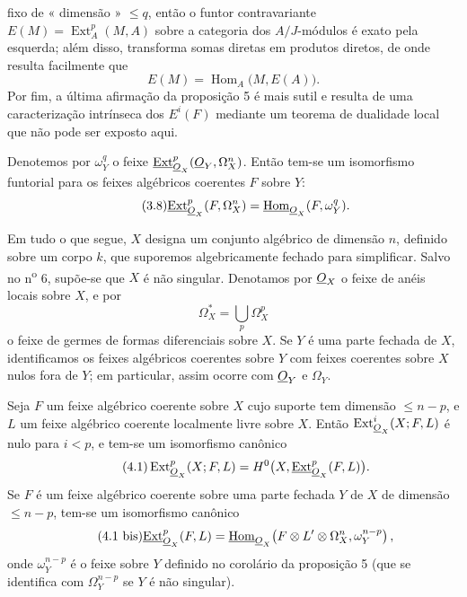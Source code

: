 fixo de « dimensão » $\leq q$, então o funtor contravariante
$E(M)=\operatorname{Ext}_{A}^{p}(M,A)$ sobre a categoria dos $A/J$-módulos é
exato pela esquerda; além disso, transforma somas diretas em produtos diretos,
de onde resulta facilmente que
\[
  E(M)=\operatorname{Hom}_{A}\bigl(M,E(A)\bigr).
\]
 Por fim, a
última afirmação da proposição 5 é mais sutil e resulta de uma
caracterização intrínseca dos $E^{i}(F)$ mediante um teorema de dualidade
local que não pode ser exposto aqui.

 Denotemos por $\omega_Y^{q}$ o feixe
$\underline{\operatorname{Ext}}_{\underline{O}_X}^{p}(\underline{O}_Y,\Omega_X^{n})$. Então tem-se um isomorfismo
funtorial para os feixes algébricos coerentes $F$ sobre $Y$:
\begin{equation}\tag{3.8}
  \underline{\operatorname{Ext}}_{\underline{O}_X}^{p}(F,\Omega_X^{n})
  =\underline{\operatorname{Hom}}_{\underline{O}_X}(F,\omega_Y^{q}).
\end{equation}


Em tudo o que segue, $X$ designa um conjunto algébrico de dimensão $n$, definido
sobre um corpo $k$, que suporemos algebricamente fechado para simplificar. Salvo
no n\textsuperscript{o} 6, supõe-se que $X$ é não singular. Denotamos por
$\underline{O}_X$ o feixe de anéis locais sobre $X$, e por
\[
  \Omega_X^{*}=\bigcup_p\Omega_X^{p}
\]
o feixe de germes de formas diferenciais sobre $X$.
Se $Y$ é uma parte fechada de $X$, identificamos
os feixes algébricos coerentes sobre $Y$ com feixes coerentes sobre $X$
nulos fora de $Y$; em particular, assim ocorre com $\underline{O}_Y$ e $\Omega_Y$.

 Seja $F$ um feixe algébrico coerente sobre $X$ cujo
suporte tem dimensão $\leq n-p$, e $L$ um feixe algébrico coerente
localmente livre sobre $X$. Então $\operatorname{Ext}_{\underline{O}_X}^{i}(X;F,L)$ é nulo
para $i<p$, e tem-se um isomorfismo canônico
\begin{equation}\tag{4.1}
  \operatorname{Ext}_{\underline{O}_X}^{p}(X;F,L)
  =H^{0}\bigl(X,\underline{\operatorname{Ext}}_{\underline{O}_X}^{p}(F,L)\bigr).
\end{equation}
Se $F$ é um feixe algébrico coerente sobre uma parte fechada $Y$ de $X$ de
dimensão $\leq n-p$, tem-se um isomorfismo canônico
\begin{equation}\tag{4.1 bis}
  \underline{\operatorname{Ext}}_{\underline{O}_X}^{p}(F,L)
  =\underline{\operatorname{Hom}}_{\underline{O}_X}\!\left(
    F\otimes L'\otimes\Omega_X^{n},\omega_Y^{n-p}
  \right),
\end{equation}
onde $\omega_Y^{n-p}$ é o feixe sobre $Y$ definido no corolário da
proposição 5 (que se identifica com $\Omega_Y^{n-p}$ se $Y$ é não singular).

